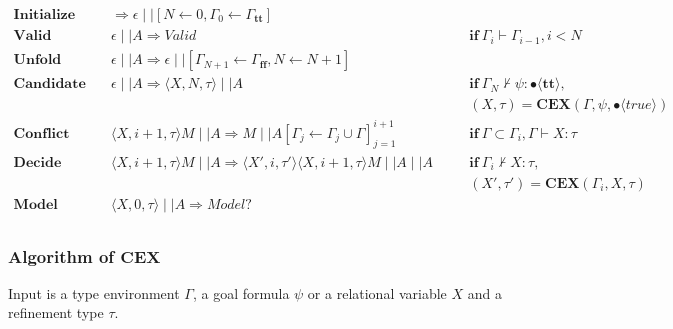 \documentclass[runningheads]{llncs}
\newcommand\COL{\mathbin{:}}
\newcommand \true {\textbf{tt}}
\newcommand \false {\textbf{ff}}
\newcommand \stypebool {\bullet}
\newcommand \typebool[1]{\stypebool \langle #1 \rangle}
\begin{document}
\begin{align*}
    \textbf{Initialize} &\quad
        \Longrightarrow
        \epsilon \mid \mid [N \leftarrow 0, \Gamma_0 \leftarrow \Gamma_\true]
        &&\\
    \textbf{Valid} &\quad
        \epsilon \mid \mid A \Longrightarrow \textit{Valid}
        &&\quad \textbf{if} \ \Gamma_{i} \vdash \Gamma_{i-1}, i < N
        \\
    \textbf{Unfold} &\quad
        \epsilon \mid \mid A \Longrightarrow
        \epsilon \mid \mid [\Gamma_{N+1} \leftarrow \Gamma_\false, N \leftarrow N + 1]
        &&\\
    \textbf{Candidate} &\quad
        \epsilon \mid \mid A
        \Longrightarrow
        \langle X, N, \tau \rangle \mid \mid A
        && \quad \textbf{if} \ \Gamma_N \not \vdash \psi \COL
        \typebool{\true},\\
        &&&\quad (X, \tau) = \textbf{CEX}(\Gamma, \psi, \typebool{true})
        \\
    \textbf{Conflict} &\quad
        \langle X, i + 1, \tau \rangle M\mid \mid A
        \Longrightarrow
        M \mid \mid A[\Gamma_j \leftarrow \Gamma_j \cup \Gamma]_{j=1}^{i+1}
        &&\quad \textbf{if} \ \Gamma \subset \Gamma_i, \Gamma \vdash X \COL \tau
        \\
    \textbf{Decide} &\quad
        \langle X, i + 1, \tau \rangle M\mid \mid A
        \Longrightarrow
        \langle X', i, \tau' \rangle \langle X, i + 1, \tau \rangle M\mid \mid A \mid \mid A
        &&\quad \textbf{if} \ \Gamma_i \not\vdash X \COL \tau,\\
        &&&\quad (X', \tau') = \textbf{CEX}(\Gamma_i, X, \tau)
        \\
    \textbf{Model} &\quad
        \langle X, 0, \tau \rangle \mid \mid A \Rightarrow Model?
        &&\\
\end{align*}


\subsubsection{Algorithm of \( \mathbf{CEX} \)}

Input is a type environment \( \Gamma \), a goal formula \( \psi \)
or a relational variable \( X \) and a refinement type \( \tau \).
\end{document}
